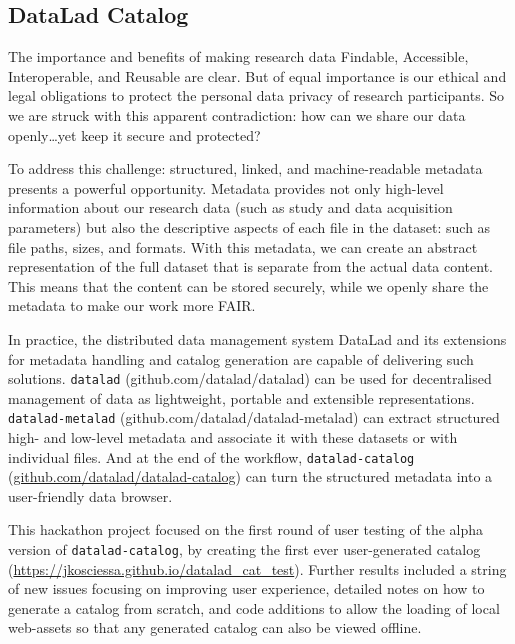 \documentclass[../main.tex]{subfiles}
\begin{document}
\subsection{DataLad Catalog}\label{sec:DLC}


The importance and benefits of making research data Findable, Accessible, Interoperable, and Reusable are clear\citep{Wilkinson2016}. But of equal importance is our ethical and legal obligations to protect the personal data privacy of research participants. So we are struck with this apparent contradiction: how can we share our data openly…yet keep it secure and protected?

To address this challenge: structured, linked, and machine-readable metadata presents a powerful opportunity. Metadata provides not only high-level information about our research data (such as study and data acquisition parameters) but also the descriptive aspects of each file in the dataset: such as file paths, sizes, and formats. With this metadata, we can create an abstract representation of the full dataset that is separate from the actual data content. This means that the content can be stored securely, while we openly share the metadata to make our work more FAIR.

In practice, the distributed data management system DataLad\citep{Halchenko2021} and its extensions for metadata handling and catalog generation are capable of delivering such solutions. \texttt{datalad} (github.com/datalad/datalad) can be used for decentralised management of data as lightweight, portable and extensible representations. \texttt{datalad-metalad} (github.com/datalad/datalad-metalad) can extract structured high- and low-level metadata and associate it with these datasets or with individual files. And at the end of the workflow, \texttt{datalad-catalog} (\url{github.com/datalad/datalad-catalog}) can turn the structured metadata into a user-friendly data browser.

This hackathon project focused on the first round of user testing of the alpha version of \texttt{datalad-catalog}, by creating the first ever user-generated catalog (\url{https://jkosciessa.github.io/datalad_cat_test}). Further results included a string of new issues focusing on improving user experience, detailed notes on how to generate a catalog from scratch, and code additions to allow the loading of local web-assets so that any generated catalog can also be viewed offline.
\end{document}

